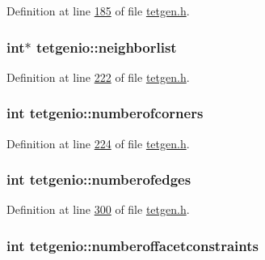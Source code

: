 Definition at line \hyperlink{tetgen_8h_source_l00185}{185} of file \hyperlink{tetgen_8h_source}{tetgen.\+h}.

\subsubsection[{\texorpdfstring{neighborlist}{neighborlist}}]{\setlength{\rightskip}{0pt plus 5cm}int$\ast$ tetgenio\+::neighborlist}\hypertarget{classtetgenio_ab79a85fdffb1ab3f93ff3645fb604d40}{}\label{classtetgenio_ab79a85fdffb1ab3f93ff3645fb604d40}


Definition at line \hyperlink{tetgen_8h_source_l00222}{222} of file \hyperlink{tetgen_8h_source}{tetgen.\+h}.

\subsubsection[{\texorpdfstring{numberofcorners}{numberofcorners}}]{\setlength{\rightskip}{0pt plus 5cm}int tetgenio\+::numberofcorners}\hypertarget{classtetgenio_a7d31410cbdcf2c1557ae7c1148c2eed7}{}\label{classtetgenio_a7d31410cbdcf2c1557ae7c1148c2eed7}


Definition at line \hyperlink{tetgen_8h_source_l00224}{224} of file \hyperlink{tetgen_8h_source}{tetgen.\+h}.

\subsubsection[{\texorpdfstring{numberofedges}{numberofedges}}]{\setlength{\rightskip}{0pt plus 5cm}int tetgenio\+::numberofedges}\hypertarget{classtetgenio_a5f2c3193ef485cbbf53416538c9df73c}{}\label{classtetgenio_a5f2c3193ef485cbbf53416538c9df73c}


Definition at line \hyperlink{tetgen_8h_source_l00300}{300} of file \hyperlink{tetgen_8h_source}{tetgen.\+h}.

\subsubsection[{\texorpdfstring{numberoffacetconstraints}{numberoffacetconstraints}}]{\setlength{\rightskip}{0pt plus 5cm}int tetgenio\+::numberoffacetconstraints}\hypertarget{classtetgenio_acd7176cc55338187a391016acfb53913}{}\label{classtetgenio_acd7176cc55338187a391016acfb53913}


